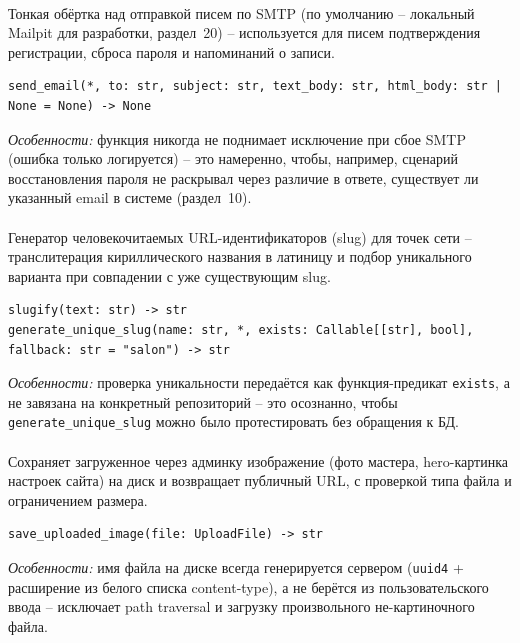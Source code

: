 \paragraph{}
Тонкая обёртка над отправкой писем по SMTP (по умолчанию -- локальный
Mailpit для разработки, раздел~20) -- используется для писем
подтверждения регистрации, сброса пароля и напоминаний о записи.
\begin{verbatim}
send_email(*, to: str, subject: str, text_body: str, html_body: str | None = None) -> None
\end{verbatim}
\textit{Особенности:} функция никогда не поднимает исключение при сбое
SMTP (ошибка только логируется) -- это намеренно, чтобы, например,
сценарий восстановления пароля не раскрывал через различие в ответе,
существует ли указанный email в системе (раздел~10).

\paragraph{}
Генератор человекочитаемых URL-идентификаторов (slug) для точек сети --
транслитерация кириллического названия в латиницу и подбор уникального
варианта при совпадении с уже существующим slug.
\begin{verbatim}
slugify(text: str) -> str
generate_unique_slug(name: str, *, exists: Callable[[str], bool], fallback: str = "salon") -> str
\end{verbatim}
\textit{Особенности:} проверка уникальности передаётся как
функция-предикат \texttt{exists}, а не завязана на конкретный
репозиторий -- это осознанно, чтобы \texttt{generate_unique_slug}
можно было протестировать без обращения к БД.

\paragraph{}
Сохраняет загруженное через админку изображение (фото мастера,
hero-картинка настроек сайта) на диск и возвращает публичный URL, с
проверкой типа файла и ограничением размера.
\begin{verbatim}
save_uploaded_image(file: UploadFile) -> str
\end{verbatim}
\textit{Особенности:} имя файла на диске всегда генерируется сервером
(\texttt{uuid4} + расширение из белого списка content-type), а не
берётся из пользовательского ввода -- исключает path traversal и
загрузку произвольного не-картиночного файла.

